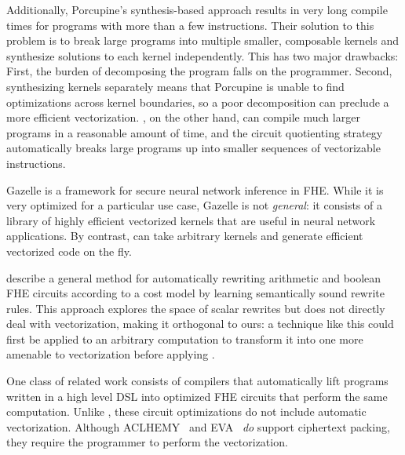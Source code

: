 Additionally, Porcupine's synthesis-based approach results in very long compile times for programs with more than a few instructions.
Their solution to this problem is to break large programs into multiple smaller, composable kernels and synthesize solutions to each kernel independently.
This has two major drawbacks: First, the burden of decomposing the program falls on the programmer. Second, synthesizing kernels separately means that Porcupine is unable to find optimizations across kernel boundaries, so a poor decomposition can preclude a more efficient vectorization.
\system, on the other hand, can compile much larger programs in a reasonable amount of time, and the circuit quotienting strategy automatically breaks large programs up into smaller sequences of vectorizable instructions. %


Gazelle \cite{Gazelle} is a framework for secure neural network inference in FHE.
While it is very optimized for a particular use case, Gazelle is not {\em general}: it consists of a library of highly efficient vectorized kernels that are useful in neural network applications.
By contrast, \system can take arbitrary kernels and generate efficient vectorized code on the fly. %

\citet{CircuitRewriting} describe a general method for automatically rewriting arithmetic and boolean FHE circuits according to a cost model by learning semantically sound rewrite rules.
This approach explores the space of scalar rewrites but does not directly deal with vectorization, making it orthogonal to ours: a technique like this could first be applied to an arbitrary computation to transform it into one more amenable to vectorization before applying \system.

One class of related work consists of compilers \cite{Ramparts, ALCHEMY, EVA, Cingulata} that automatically lift programs written in a high level DSL into optimized FHE circuits that perform the same computation.
Unlike \system, these circuit optimizations do not include automatic vectorization. Although ACLHEMY~\cite{ALCHEMY} and EVA~\cite{EVA} \textit{do} support ciphertext packing, they require the programmer to perform the vectorization.

